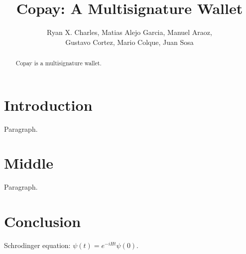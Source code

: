 \documentclass{article}
\begin{document}
\pagestyle{headings}
\title{Copay: A Multisignature Wallet}
\author{
Ryan X. Charles,
Matias Alejo Garcia,
Manuel Araoz,\\
Gustavo Cortez,
Mario Colque,
Juan Sosa
}
\date{}
\maketitle
\begin{abstract}
Copay is a multisignature wallet.
\end{abstract}

\section{Introduction}

Paragraph.

\section{Middle}

Paragraph.

\section{Conclusion}

Schrodinger equation: $\psi(t)=e^{-iHt}\psi(0)$.
\end{document}
